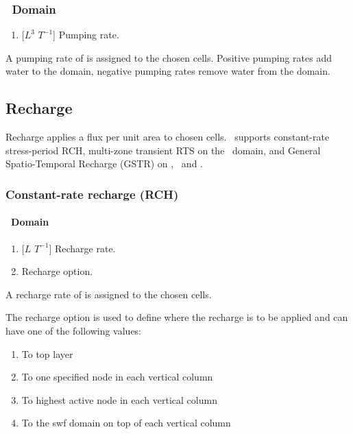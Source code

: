 \subsubsection{\cln\ Domain}
    {
        \squish
        \begin{enumerate}
            \item {} [$L^{3}$ $T^{-1}$]  Pumping rate.
        \end{enumerate}
        A pumping rate of  is assigned to the chosen cells. Positive pumping rates add water to the domain, negative pumping rates remove water from the domain.
    }

\subsection{Recharge}
Recharge applies a flux per unit area to chosen cells.
\mut\ supports constant-rate stress-period \textsf{RCH}, multi-zone transient \textsf{RTS} on the \swf\ domain, and General Spatio-Temporal Recharge (\textsf{GSTR}) on \gwf, \swf\ and \cln.

\subsubsection{Constant-rate recharge (\textsf{RCH})}
\paragraph*{\gwf\ Domain}
    {
        \squish
        \begin{enumerate}
            \item {} [$L$ $T^{-1}$]  Recharge rate.
            \item {}  Recharge option.
        \end{enumerate}
        A recharge rate of  is assigned to the chosen cells.

        The recharge option  is used to define where the recharge is to be applied and can have one of the following values:
        \begin{enumerate}
            \item To top layer
            \item To one specified node in each vertical column
            \item To highest active node in each vertical column
            \item To the swf domain on top of each vertical column
        \end{enumerate}
    }

